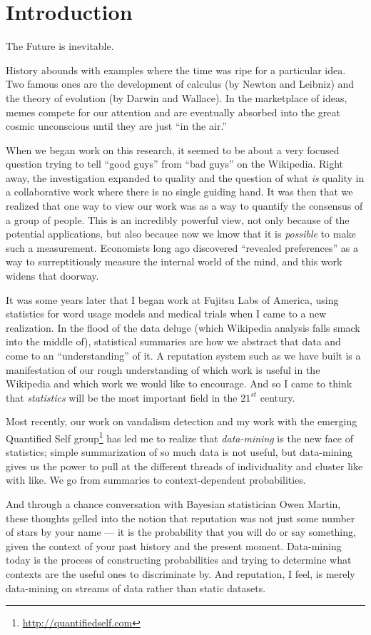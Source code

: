 \section{Introduction}

The Future is inevitable.

History abounds with examples where the time was ripe for a particular idea.
Two famous ones are the development of calculus (by Newton and Leibniz)
and the theory of evolution (by Darwin and Wallace).
In the marketplace of ideas, memes compete for our attention and
are eventually absorbed into the great cosmic unconscious until
they are just ``in the air.''

When we began work on this research, it seemed to be about a very focused
question trying to tell ``good guys'' from ``bad guys'' on the Wikipedia.
Right away, the investigation expanded to quality and the question of what
\textit{is} quality in a collaborative work where there is no single
guiding hand.
It was then that we realized that one way to view our work was as a
way to quantify the consensus of a group of people.
This is an incredibly powerful view, not only because of the potential
applications, but also because now we know that it is \textit{possible}
to make such a measurement.
Economists long ago discovered ``revealed preferences''
as a way to surreptitiously measure the internal world of the mind,
and this work widens that doorway.

It was some years later that I began work at Fujitsu Labs of America,
using statistics for word usage models and medical trials when I came to
a new realization.
In the flood of the data deluge (which Wikipedia analysis falls smack
into the middle of), statistical summaries are how we abstract that data
and come to an ``understanding'' of it.
A reputation system such as we have built is a manifestation of our
rough understanding of which work is useful in the Wikipedia and
which work we would like to encourage.
And so I came to think that \textit{statistics} will be the
most important field in the $21^{st}$ century.

Most recently, our work on vandalism detection and my work with the
emerging Quantified Self group\footnote{\url{http://quantifiedself.com}}
has led me to realize that
\textit{data-mining} is the new face of statistics; simple summarization
of so much data is not useful, but data-mining gives us the power to
pull at the different threads of individuality and cluster like with like.
We go from summaries to context-dependent probabilities.

And through a chance conversation with Bayesian statistician
Owen Martin, these thoughts gelled into the notion that reputation
was not just some number of stars by your name --- it is the probability
that you will do or say something, given the context of your past history
and the present moment.
Data-mining today is the process of constructing probabilities and
trying to determine what contexts are the useful ones to discriminate by.
And reputation, I feel, is merely data-mining on streams of data
rather than static datasets.

